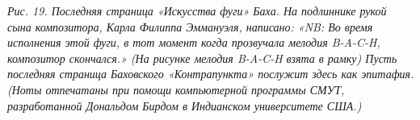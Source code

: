 \documentclass[../main.tex]{subfiles}
\begin{document}
\begin{dialogue}

\emph{Рис. 19. Последняя страница «Искусства фуги» Баха. На подлиннике рукой сына композитора, Карла Филиппа Эммануэля, написано: «NB: Во время исполнения этой фуги, в тот момент когда прозвучала мелодия \mbox{B-A-C-H}, композитор скончался.» (На рисунке мелодия \mbox{B-A-C-H} взята в рамку) Пусть последняя страница Баховского «Контрапункта» послужит здесь как эпитафия. (Ноты отпечатаны при помощи компьютерной программы СМУТ, разработанной Дональдом Бирдом в Индианском университете США.)}

\end{dialogue}
\end{document}
